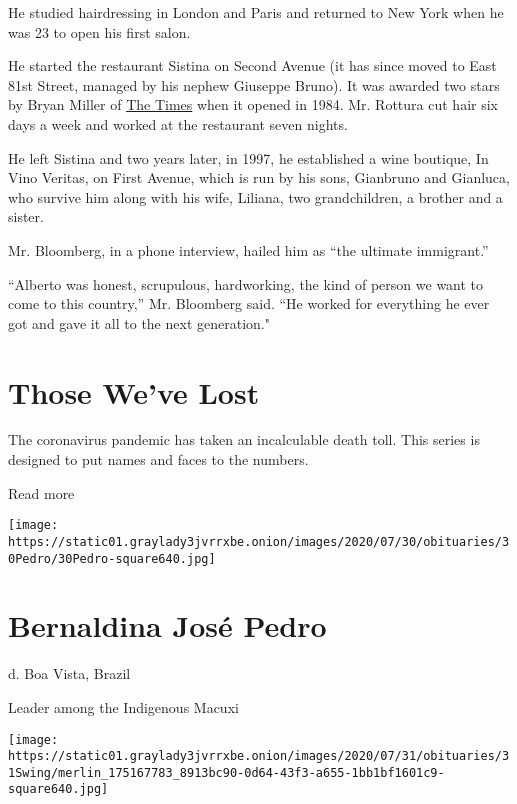 He studied hairdressing in London and Paris and returned to New York
when he was 23 to open his first salon.

He started the restaurant Sistina on Second Avenue (it has since moved
to East 81st Street, managed by his nephew Giuseppe Bruno). It was
awarded two stars by Bryan Miller of
\href{https://www.nytimes3xbfgragh.onion/1984/11/16/arts/restaurants-northern-italian-onsecondavenue.html}{The
Times} when it opened in 1984. Mr. Rottura cut hair six days a week and
worked at the restaurant seven nights.

He left Sistina and two years later, in 1997, he established a wine
boutique, In Vino Veritas, on First Avenue, which is run by his sons,
Gianbruno and Gianluca, who survive him along with his wife, Liliana,
two grandchildren, a brother and a sister.

Mr. Bloomberg, in a phone interview, hailed him as ``the ultimate
immigrant.''

``Alberto was honest, scrupulous, hardworking, the kind of person we
want to come to this country,'' Mr. Bloomberg said. ``He worked for
everything he ever got and gave it all to the next generation."

\href{https://www.nytimes3xbfgragh.onion/interactive/2020/obituaries/people-died-coronavirus-obituaries.html?action=click\&pgtype=Article\&state=default\&region=BELOW_MAIN_CONTENT\&context=covid_obits_promo}{}

\hypertarget{those-weve-lost}{%
\section{Those We've Lost}\label{those-weve-lost}}

The coronavirus pandemic has taken an incalculable death toll. This
series is designed to put names and faces to the numbers.

Read more

\texttt{[image: https://static01.graylady3jvrrxbe.onion/images/2020/07/30/obituaries/30Pedro/30Pedro-square640.jpg]}

\hypertarget{bernaldina-josuxe9-pedro}{%
\section{Bernaldina José Pedro}\label{bernaldina-josuxe9-pedro}}

d. Boa Vista, Brazil

Leader among the Indigenous Macuxi

\texttt{[image: https://static01.graylady3jvrrxbe.onion/images/2020/07/31/obituaries/31Swing/merlin\_175167783\_8913bc90-0d64-43f3-a655-1bb1bf1601c9-square640.jpg]}


